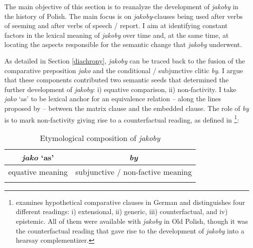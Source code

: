 \documentclass[output=paper
,modfonts
,nonflat]{langsci/langscibook}
\begin{document}
The main objective of this section is to reanalyze the development of \emph{jakoby} in the history of Polish. The main focus is on \emph{jakoby}-clauses being used after verbs of seeming and after verbs of speech / report. I aim at identifying constant factors in the lexical meaning of \emph{jakoby} over time and, at the same time, at locating the aspects responsible for the semantic change that \emph{jakoby} underwent. 

As detailed in Section \ref{diachrony}, \emph{jakoby} can be traced back to the fusion of the comparative preposition \emph{jako} and the conditional / subjunctive clitic \emph{by}. I argue that these components contributed two semantic seeds that determined the further development of \emph{jakoby}: i) equative comparison, ii) non-factivity. I take \emph{jako} `as' to be lexical anchor for an equivalence relation – along the lines proposed by \textcite{Umbach-Gust2014} – between the matrix clause and the embedded clause. The role of \emph{by} is to mark non-factivity giving rise to a counterfactual reading, as defined in \textcite[988]{Bucking2017}\footnote{\textcite{Bucking2017} examines hypothetical comparative clauses in German and distinguishes four different readings: i) extensional, ii) generic, iii) counterfactual, and iv) epistemic. All of them were available with \emph{jakoby} in Old Polish, though it was the counterfactual reading that gave rise to the development of \emph{jakoby} into a hearsay complementizer. 
}:  

\begin{table}[h] \center
\begin{tabular}{cc} 
 \lsptoprule
 \emph{jako} `as' & \emph{by} \\
\midrule
equative meaning & subjunctive / non-factive meaning \\
 \lspbottomrule
\end{tabular}
\caption{Etymological composition of \emph{jakoby}}
\end{table}
  
\end{document}

